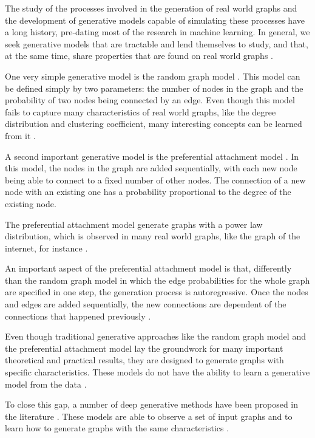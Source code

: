 \documentclass[12pt,a4paper]{article}
\begin{document}
	The study of the processes involved in the generation of real world graphs and the development of generative models capable of simulating these processes have a long history, pre-dating most of the research in machine learning. In general, we seek generative models that are tractable and lend themselves to study, and that, at the same time, share properties that are found on real world graphs \citep{Hamilton2020}.
	
	One very simple generative model is the random graph model \citep{ErdösandRényi1960}. This model can be defined simply by two parameters: the number of nodes in the graph and the probability of two nodes being connected by an edge. Even though this model fails to capture many characteristics of real world graphs, like the degree distribution and clustering coefficient, many interesting concepts can be learned from it \citep{Newman2019}.
	
	A second important generative model is the preferential attachment model \citep{AlbertandBarabási2002}. In this model, the nodes in the graph are added sequentially, with each new node being able to connect to a fixed number of other nodes. The connection of a new node with an existing one has a probability proportional to the degree of the existing node.
	
	The preferential attachment model generate graphs with a power law distribution, which is observed in many real world graphs, like the graph of the internet, for instance \citep{Newman2019}.
	
	An important aspect of the preferential attachment model is that, differently than the random graph model in which the edge probabilities for the whole graph are specified in one step, the generation process is autoregressive. Once the nodes and edges are added sequentially, the new connections are dependent of the connections that happened previously \citep{Hamilton2020}.
	
	Even though traditional generative approaches like the random graph model and the preferential attachment model lay the groundwork for many important theoretical and practical results, they are designed to generate graphs with specific characteristics. These models do not have the ability to learn a generative model from the data \citep{Hamilton2020}.
	
	To close this gap, a number of deep generative methods have been proposed in the literature \citep{KipfandWelling2016, SimonovskyandKomodakis2018, DeCao2018, Li2018, You2018, Liao2019}. These models are able to observe a set of input graphs and to learn how to generate graphs with the same characteristics \citep{Hamilton2020}.
	
\end{document}
